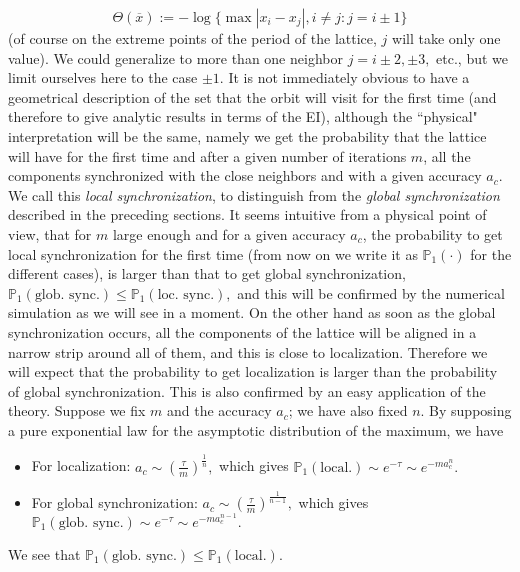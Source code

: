 \documentclass[12pt,reqno,a4paper]{amsart}
\begin{document}
\begin{equation}\label{S2}
 \Theta(\overline{x}):=-\log\{\max|x_i-x_j|, i\neq j: j=i\pm1\}
 \end{equation}
    (of course on the extreme points of the period of the lattice, $j$  will take only one value).
     We could generalize to more than one neighbor $j=i\pm 2, \pm3,$ etc., but we limit ourselves here to the case $\pm1.$ It is not immediately obvious to have a geometrical description of the set that the orbit will visit for the first time (and therefore to give analytic results  in terms of the EI), although the ``physical" interpretation will be the same, namely we get the probability that the lattice will have for the first time and after a given number of iterations $m$, all the components synchronized with the close neighbors and with a given accuracy $a_c$. We call this {\em local synchronization}, to distinguish   from the {\em global synchronization} described in the preceding sections. It seems intuitive  from a physical point of view, that for $m$ large enough and for a given accuracy $a_c$, the probability to get local synchronization for the first time (from now on we write it as $\mathbb{P}_1(\cdot)$ for the different cases), is larger than that to get global synchronization, $\mathbb{P}_1(\text{glob. sync.})\le \mathbb{P}_1(\text{loc. sync.}),$ and this will be confirmed by the numerical simulation as we will see in a moment. On the other hand as soon as the global synchronization occurs, all the components of the lattice will be aligned in a narrow strip around all of them, and this is close  to localization. Therefore we will expect that
 the probability to get localization is larger than the probability of global synchronization. This is also confirmed by an easy  application of the theory.   Suppose we fix $m$ and the accuracy $a_c$; we have also fixed $n$. By supposing a pure exponential law for the asymptotic distribution of the maximum, we have
    \begin{itemize}
    \item For localization: $a_c\sim (\frac{\tau}{m})^{\frac1n},$ which gives $\mathbb{P}_1 (\text{local.})\sim e^{-\tau}\sim e^{-ma_c^n}.$
        \item For global synchronization: $a_c\sim (\frac{\tau}{m})^{\frac{1}{n-1}},$ which gives $\mathbb{P}_1 (\text{glob. sync.})\sim e^{-\tau}\sim e^{-ma_c^{n-1}}.$
    \end{itemize}
    We see that $\mathbb{P}_1 (\text{glob. sync.})\le \mathbb{P}_1 (\text{local.}).$\\
\end{document}
